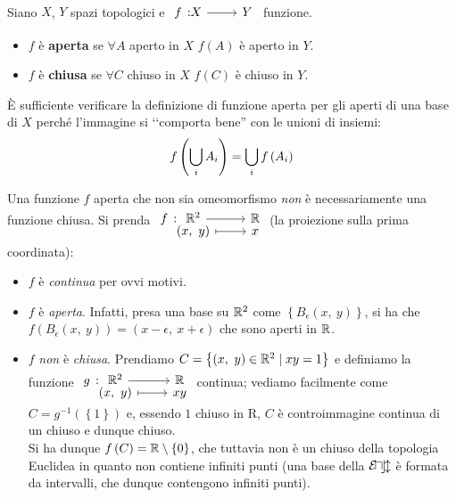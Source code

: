 \begin{define}~{}\\
Siano $X$, $Y$ spazi topologici e $\funz{f}{X}{Y}$ funzione.
\begin{itemize}
\item $f$ è \textbf{aperta} se $\forall A$ aperto in $X$ $f\left(A\right)$ è aperto in $Y$.
\item $f$ è \textbf{chiusa} se $\forall C$ chiuso in $X$ $f\left(C\right)$ è chiuso in $Y$.
\end{itemize}
\vspace{-3mm}
\end{define}
\begin{observe}
	È sufficiente verificare la definizione di funzione aperta per gli aperti di una base di $X$ perché l'immagine si ‘‘comporta bene'' con le unioni di insiemi:
	\begin{equation*}
		f\left(\mathop{{\bigcup}}\displaylimits_{i}A_i\right)=\mathop{{\bigcup}}\displaylimits_{i}f\left(A_i\right)
	\end{equation*}
\vspace{-6mm}
\end{observe}
\begin{attention}
	Una funzione $f$ aperta che non sia omeomorfismo \textit{non} è necessariamente una funzione chiusa. Si prenda $\funztot{f}{\realset^2}{\realset}{\left(x,\ y\right)}{x}$ (la proiezione sulla prima coordinata):
	\begin{itemize}
		\item $f$ è \textit{continua} per ovvi motivi.
		\item $f$ è \textit{aperta}. Infatti, presa una base su $\mathbb{R}^2$ come $\left\{B_{\epsilon}\left(x,\ y\right)\right\}$, si ha che $f\left(B_{\epsilon}\left(x,\ y\right)\right)=\left(x-\epsilon,\ x+\epsilon\right)$ che sono aperti in $\mathbb{R}$.
		\item $f$ \textit{non} è \textit{chiusa}. Prendiamo $C=\left\{\left(x,\ y\right)\in \mathbb{R}^2\mid xy=1 \right\}$ e definiamo la funzione $\funztot{g}{\realset^2}{\realset}{\left(x,\ y\right)}{xy}$ continua; vediamo facilmente come $C=g^{-1}\left(\left\{1\right\}\right)$ e, essendo ${1}$ chiuso in $\mathrm{R}$, $C$ è controimmagine continua di un chiuso e dunque chiuso.\\
		Si ha dunque $f\left(C\right)=\mathbb{R}\setminus\left\{0\right\}$, che tuttavia non è un chiuso della topologia Euclidea in quanto non contiene infiniti punti (una base della $\mathcal{E\! u\! c\! l}$ è formata da intervalli, che dunque contengono infiniti punti).
	\end{itemize}
\vspace{-3mm}
\end{attention}
